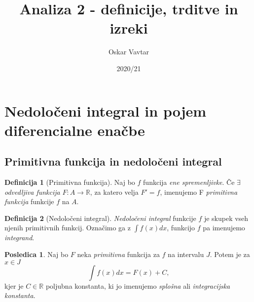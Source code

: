 \documentclass[11pt]{article}
\title{Analiza 2 - definicije, trditve in izreki}
\author{Oskar Vavtar}
\date{2020/21}
\theoremstyle{definition}
\newtheorem{definicija}{Definicija}[section]
\newtheorem*{posledica}{Posledica}
\begin{document}
\maketitle
\pagebreak
\tableofcontents
\pagebreak


\section{Nedoločeni integral in pojem diferencialne enačbe}
\vspace{0.5cm}


\subsection{Primitivna funkcija in nedoločeni integral}
\vspace{0.5cm}

\begin{definicija}[Primitivna funkcija]

Naj bo $f$ funkcija \textit{ene spremenljivke}. Če $\exists$ \textit{odvedljiva funkcija} $F: A \rightarrow \mathbb{R}$, za katero velja $F' = f$, imenujemo F \textit{primitivna funkcija} funkcije $f$ na $A$. 

\end{definicija}
\vspace{0.5cm}

\begin{definicija}[Nedoločeni integral]

\textit{Nedoločeni integral} funkcije $f$ je skupek vseh njenih primitivnih funkcij. Označimo ga z $\int f(x) dx$, funkcijo $f$ pa imenujemo \textit{integrand}.

\end{definicija}

\begin{posledica}

Naj bo $F$ neka \textit{primitivna} funkcija za $f$ na intervalu $J$. Potem je za $x \in J$
$$\int f(x) dx = F(x) + C,$$
kjer je $C \in \mathbb{R}$ poljubna konstanta, ki jo imenujemo \textit{splošna} ali \textit{integracijska konstanta}.

\end{posledica}
\vspace{0.5cm}
\end{document}
